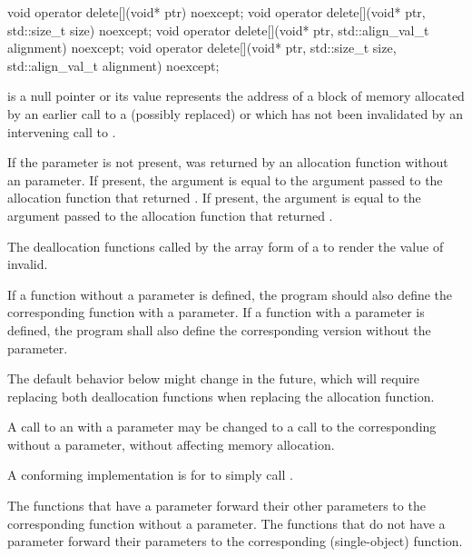 %
\begin{itemdecl}
void operator delete[](void* ptr) noexcept;
void operator delete[](void* ptr, std::size_t size) noexcept;
void operator delete[](void* ptr, std::align_val_t alignment) noexcept;
void operator delete[](void* ptr, std::size_t size, std::align_val_t alignment) noexcept;
\end{itemdecl}

\begin{itemdescr}
\pnum
\expects
{} is a null pointer or
its value represents the address of
a block of memory allocated by
an earlier call to a (possibly replaced)
or
which has not been invalidated by an intervening call to
.

\pnum
If the  parameter is not present,
 was returned by an allocation function
without an  parameter.
If present, the  argument
is equal to the  argument
passed to the allocation function that returned .
If present, the  argument
is equal to the  argument
passed to the allocation function that returned .

\pnum
\effects
The
deallocation functions
called by the array form of a
to render the value of  invalid.

\pnum
\replaceable
{}
If a function without a  parameter is defined,
the program should also define
the corresponding function with a  parameter.
If a function with a  parameter is defined,
the program shall also define
the corresponding version without the  parameter.
\begin{note}
The default behavior below might change in the future, which will require
replacing both deallocation functions when replacing the allocation function.
\end{note}

\pnum
\required
A call to an 
with a  parameter
may be changed to
a call to the corresponding 
without a  parameter,
without affecting memory allocation.
\begin{note}
A conforming implementation is for
 to simply call
.
\end{note}

\pnum
{}
The functions that have a  parameter
forward their other parameters
to the corresponding function without a  parameter.
The functions that do not have a  parameter
forward their parameters
to the corresponding  (single-object) function.
\end{itemdescr}

